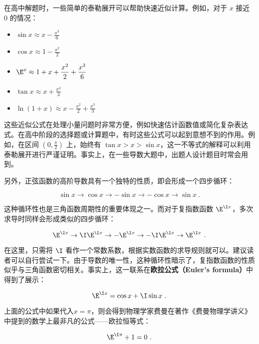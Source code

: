 在高中解题时，一些简单的泰勒展开可以帮助快速近似计算。例如，对于 $x$ 接近 $0$ 的情况：
\begin{itemize}
\item $\displaystyle\sin x \approx x - \frac{x^3}{6}$
\item $\displaystyle\cos x \approx 1 - \frac{x^2}{2}$
\item $\displaystyle \E^x \approx 1 + x + \frac{x^2}{2} + \frac{x^3}{6}$
\item $\displaystyle\tan x \approx x + \frac{x^3}{3}$
\item $\displaystyle\ln (1 + x) \approx x - \frac{x^2}{2} + \frac{x^3}{3}$
\end{itemize}

这些近似公式在处理小量问题时非常方便，例如快速估计函数值或简化复杂表达式。在高中阶段的选择题或计算题中，有时这些公式可以起到意想不到的作用。例如，在区间 $(0, \frac{\pi}{2})$ 上，始终有 $\tan x > x > \sin x$，这一不等式的解释可以利用泰勒展开进行严谨证明。事实上，在一些导数大题中，出题人设计题目时常会用到。

另外，正弦函数的高阶导数具有一个独特的性质，即会形成一个四步循环：

\begin{equation}
\sin x \to \cos x \to -\sin x \to -\cos x \to \sin x~.
\end{equation}

这种循环性也是三角函数周期性的重要体现之一。而对于复指数函数 $\E^{\I x}$，多次求导时同样会形成类似的四步循环：

\begin{equation}
\E^{\I x} \to \I\E^{\I x} \to -\E^{\I x} \to -\I\E^{\I x} \to \E^{\I x}~.
\end{equation}

在这里，只需将 $\I$ 看作一个常数系数，根据实数函数的求导规则就可以。建议读者可以自行尝试一下。由于导数的唯一性，这种循环性暗示了，复指数函数的性质似乎与三角函数密切相关。事实上，这一联系在\textbf{欧拉公式（Euler’s formula）}中得到了展示：

\begin{equation}
\E^{\I x} = \cos x + \I\sin x~.
\end{equation}

上面的公式中如果代入$x=\pi$，则会得到物理学家费曼在著作《费曼物理学讲义》中提到的数学上最非凡的公式——欧拉恒等式：

\begin{equation}
\E^{\I \pi} + 1= 0~.
\end{equation}


